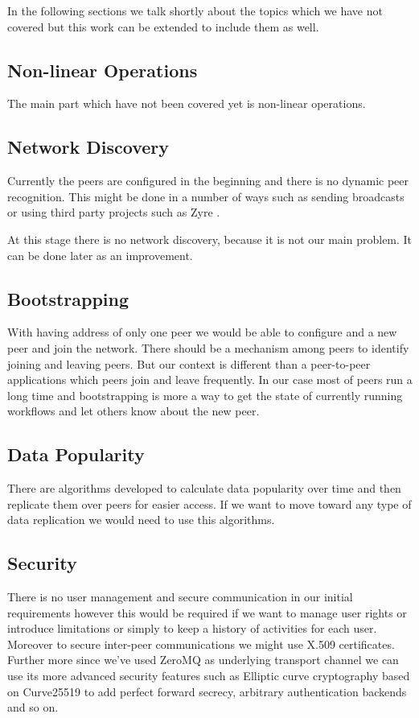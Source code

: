 In the following sections we talk shortly about the topics which we have
not covered but this work can be extended to include them as well.

\subsection{Non-linear Operations}
The main part which have not been covered yet is non-linear operations.


\subsection{Network Discovery}
Currently the peers are configured in the beginning and there is no dynamic peer recognition. This might be done in a number of ways
such as sending broadcasts or using third party projects such as Zyre \cite{Zyre}.

At this stage there is no network discovery, because it is not our main problem. It can be done later as an improvement.

\subsection{Bootstrapping}
With having address of only one peer we would be able to configure and a new peer and join the network. There should be a mechanism among
peers to identify joining and leaving peers. But our context is different than a peer-to-peer applications which peers join and leave 
frequently. In our case most of peers run a long time and bootstrapping is more a way to get the state of currently running workflows and
let others know about the new peer.

\subsection{Data Popularity}
There are algorithms developed to calculate data popularity over time and then replicate them over peers for easier access. If we want to 
move toward any type of data replication we would need to use this algorithms.

\subsection{Security}
There is no user management and secure communication in our initial requirements however this would be required if we want to manage user
rights or introduce limitations or simply to keep a history of activities for each user. Moreover to secure inter-peer communications 
we might use X.509 certificates. Further more since we've used ZeroMQ\cite{ZeroMQ} as underlying transport channel we can use its more advanced
security features such as Elliptic curve cryptography\cite{Curve} based on Curve25519\cite{Curve25519} to add perfect forward secrecy, 
arbitrary authentication backends and so on.

